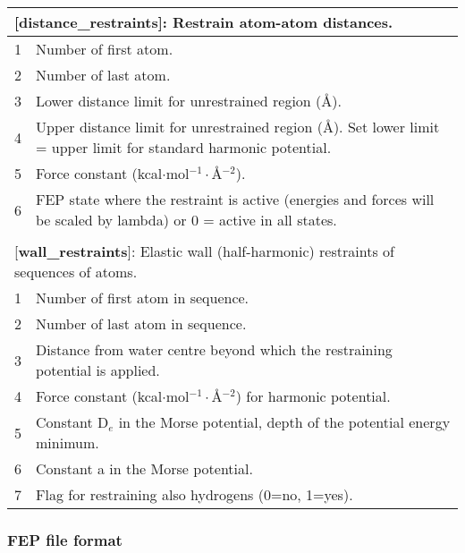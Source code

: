 \documentclass[a4paper,10pt]{article}
\begin{document}
\begin{longtable}{|p{78pt}|p{158pt}|p{158pt}|}
\multicolumn{3}{p{394pt}}{[\textbf{distance\_restraints}]: Restrain atom-atom distances.}\\
\hline 1 & \multicolumn{2}{p{320pt}|}{  Number of first atom.}\\
\hline 2 & \multicolumn{2}{p{320pt}|}{  Number of last atom.}\\
\hline 3 & \multicolumn{2}{p{320pt}|}{  Lower distance limit for unrestrained region (\AA).}\\
\hline 4 & \multicolumn{2}{p{320pt}|}{  Upper distance limit for unrestrained region (\AA). Set lower limit = upper limit for standard harmonic potential.}\\
\hline 5 & \multicolumn{2}{p{320pt}|}{  Force constant (kcal$\cdot$mol$^{-1}\cdot$\AA$^{-2}$).}\\
\hline 6 & \multicolumn{2}{p{320pt}|}{  FEP state where the restraint is active (energies and forces will be scaled by lambda) or 0 = active in all states.}\\
\hline
\multicolumn{3}{p{394pt}}{}\\

\multicolumn{3}{p{394pt}}{[\textbf{wall\_restraints}]: Elastic wall (half-harmonic) restraints of sequences of atoms.}\\
\hline 1 & \multicolumn{2}{p{320pt}|}{  Number of first atom in sequence.}\\
\hline 2 & \multicolumn{2}{p{320pt}|}{  Number of last atom in sequence.}\\
\hline 3 & \multicolumn{2}{p{320pt}|}{  Distance from water centre beyond which the restraining potential is applied.}\\
\hline 4 & \multicolumn{2}{p{320pt}|}{  Force constant (kcal$\cdot$mol$^{-1}\cdot$\AA$^{-2}$) for harmonic potential.}\\
\hline 5 & \multicolumn{2}{p{320pt}|}{  Constant D$_{e}$ in the Morse potential, depth of the potential energy minimum.}\\
\hline 6 & \multicolumn{2}{p{320pt}|}{  Constant a in the Morse potential.}\\
\hline 7 & \multicolumn{2}{p{320pt}|}{  Flag for restraining also hydrogens (0=no, 1=yes).}\\
\hline
\end{longtable}
\normalsize

\subsubsection{FEP file format}
\label{subsubsec:fepfileformat}
\end{document}
